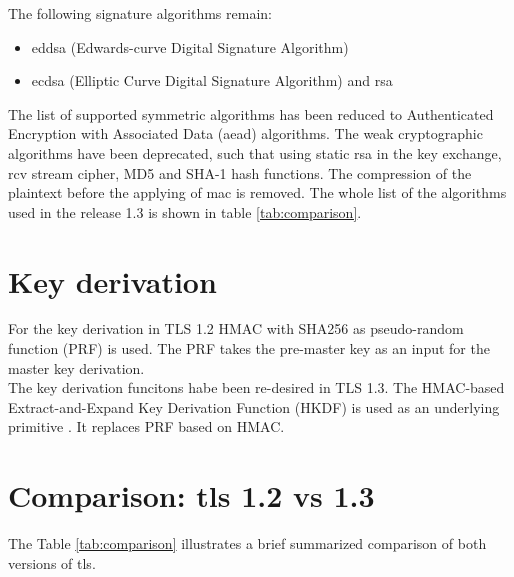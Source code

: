 The following signature algorithms remain: 
\begin{itemize}
	\item \gls{eddsa} (Edwards-curve Digital Signature Algorithm)
	\item \gls{ecdsa} (Elliptic Curve Digital Signature Algorithm) and \gls{rsa}
\end{itemize}

The list of supported symmetric algorithms has been reduced to Authenticated Encryption with Associated Data (\gls{aead}) algorithms.
The weak cryptographic algorithms have been deprecated, such that using static \gls{rsa} in the key exchange, \gls{rcv} stream cipher, MD5 and SHA-1 hash functions. The compression of the plaintext before the applying of \gls{mac} is removed.
The whole list of the algorithms used in the release 1.3 is shown in table \ref{tab:comparison}.
\cite{recorla}
\section{Key derivation}
\label{sec:comparison_kdf}

For the key derivation in TLS 1.2 HMAC with SHA256 as pseudo-random function (PRF) is used. The PRF takes the pre-master key as an input for the master key derivation. \\
The key derivation funcitons habe been re-desired in TLS 1.3. The HMAC-based Extract-and-Expand Key Derivation Function (HKDF) is used as an underlying primitive \cite{Hassenstein}. It replaces PRF based on HMAC.


\section{Comparison: \gls{tls} 1.2 vs 1.3}
\label{sec:comparison}

The Table \ref{tab:comparison} illustrates a brief summarized comparison of both versions of \gls{tls}.


